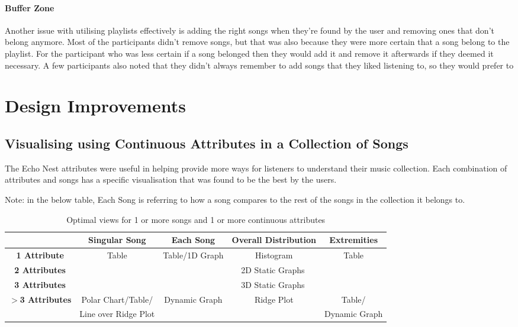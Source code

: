 \paragraph{Buffer Zone}
Another issue with utilising playlists effectively is adding the right songs when they're found by the user and removing ones that don't belong anymore. Most of the participants didn't remove songs, but that was also because they were more certain that a song belong to the playlist. For the participant who was less certain if a song belonged then they would add it and remove it afterwards if they deemed it necessary. A few participants also noted that they didn't always remember to add songs that they liked listening to, so they would prefer to 

\section{Design Improvements}
\subsection{Visualising using Continuous Attributes in a Collection of Songs}
The Echo Nest attributes were useful in helping provide more ways for listeners to understand their music collection. Each combination of attributes and songs has a specific visualisation that was found to be the best by the users.

Note: in the below table, Each Song is referring to how a song compares to the rest of the songs in the collection it belongs to.

\begin{longtable}[c]{| c | c | c | c | c|}
    \caption{Optimal views for 1 or more songs and 1 or more continuous attributes} \\
    \toprule
    & \textbf{Singular Song}
    & \textbf{Each Song} %
    & \textbf{Overall Distribution}
    & \textbf{Extremities} %
    \\ \midrule \endhead

    \textbf{1 Attribute} & \multirow{3}{*}{Table} & Table/1D Graph & Histogram & Table \\*
    \cmidrule{1-1}\cmidrule{3-5}
    \textbf{2 Attributes} & & \multicolumn{3}{c|}{2D Static Graphs} \\*
    \cmidrule{1-1}\cmidrule{3-5}
    \textbf{3 Attributes} & & \multicolumn{3}{c|}{3D Static Graphs} \\*
    \midrule
    \multirow{2}{*}{\textbf{\(>\)3 Attributes}} & Polar Chart/Table/ & \multirow{2}{*}{Dynamic Graph} & \multirow{2}{*}{Ridge Plot} & Table/\\*
    & Line over Ridge Plot & & & Dynamic Graph \\*
    \midrule
\end{longtable}

